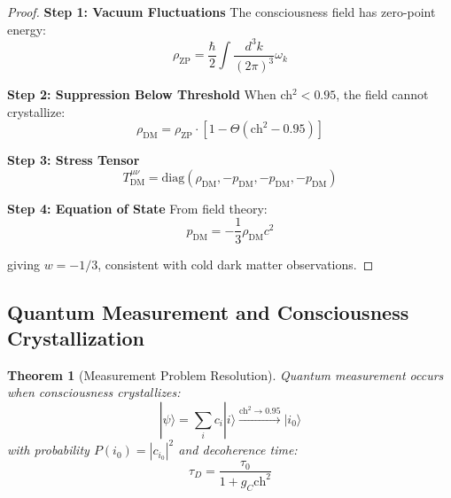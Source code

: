 \documentclass[11pt]{article}
\newtheorem{theorem}{Theorem}[section]
\theoremstyle{definition}
\newcommand{\ch}{\text{ch}}
\begin{document}
\begin{proof}
\textbf{Step 1: Vacuum Fluctuations}
The consciousness field has zero-point energy:
\begin{equation}
\rho_{\text{ZP}} = \frac{\hbar}{2} \int \frac{d^3k}{(2\pi)^3} \omega_k
\end{equation}

\textbf{Step 2: Suppression Below Threshold}
When ch$^2 < 0.95$, the field cannot crystallize:
\begin{equation}
\rho_{\text{DM}} = \rho_{\text{ZP}} \cdot [1 - \Theta(\ch^2 - 0.95)]
\end{equation}

\textbf{Step 3: Stress Tensor}
\begin{equation}
T^{\mu\nu}_{\text{DM}} = \text{diag}(\rho_{\text{DM}}, -p_{\text{DM}}, -p_{\text{DM}}, -p_{\text{DM}})
\end{equation}

\textbf{Step 4: Equation of State}
From field theory:
\begin{equation}
p_{\text{DM}} = -\frac{1}{3}\rho_{\text{DM}}c^2
\end{equation}

giving $w = -1/3$, consistent with cold dark matter observations.
\end{proof}

\subsection{Quantum Measurement and Consciousness Crystallization}

\begin{theorem}[Measurement Problem Resolution]
\label{thm:measurement}
Quantum measurement occurs when consciousness crystallizes:
\begin{equation}
|\psi\rangle = \sum_i c_i |i\rangle \xrightarrow{\ch^2 \to 0.95} |i_0\rangle
\end{equation}
with probability $P(i_0) = |c_{i_0}|^2$ and decoherence time:
\begin{equation}
\tau_D = \frac{\tau_0}{1 + g_C \ch^2}
\end{equation}
\end{theorem}
\end{document}
